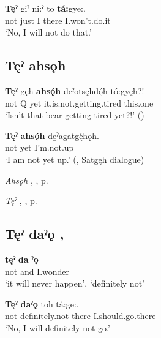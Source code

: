 \ea
\label{ex:tpart8}
\gll \textbf{Tęˀ} giˀ ni:ˀ to \textbf{tá:}gye:. \\
not just I there I.won’t.do.it\\
\glt ‘No, I will not do that.’
\z



\subsection*{\textbf{Tęˀ ahsǫh} } \label{p:[tęˀ ahsǫh]}

\ea
\label{ex:tpart9}
\gll \textbf{Tęˀ} gęh \textbf{ahsǫ́h} de̱ˀotsęhdǫ́h tó:gyęh?!\\
not Q yet it.is.not.getting.tired this.one\\
\glt ‘Isn’t that bear getting tired yet?!’ (\cite{carrier_legends_2013})
\z


\ea
\label{ex:tpart10}
\gll \textbf{Tęˀ} \textbf{ahsǫ́h} de̱ˀagatgę́hǫh.\\
not yet I’m.not.up\\
\glt ‘I am not yet up.’ (\cite[142]{mithun_watewayestanih_1984}, Satgęh dialogue)
\z

\begin{CayugaRelated}
\item \textit{Ahsǫh} , , p. \pageref{p:[ahsǫh] ‘still’, ‘yet’}\\
\item \textit{Tęˀ} , , p. \pageref{p:[tęˀ]}
\end{CayugaRelated}

\subsection*{\textbf{Tęˀ daˀǫ} , } \label{p:[tęˀ daˀǫ]}

\ea
\label{ex:tpart11}
\gll \textbf{tęˀ} \textbf{da} \textbf{ˀǫ}\\
not and I.wonder\\
\glt ‘it will never happen’, ‘definitely not’
\z

\ea
\label{ex:tpart12}
\gll \textbf{Tęˀ} \textbf{daˀǫ} toh tá:ge:.\\
not definitely.not there I.should.go.there\\
\glt ‘No, I will definitely not go.’
\z

